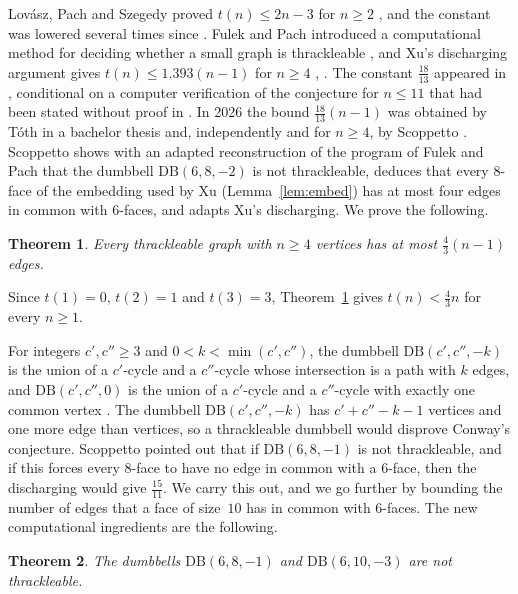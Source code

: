 \documentclass[11pt]{amsart}
\newtheorem{theorem}{Theorem}[section]
\theoremstyle{definition}
\theoremstyle{remark}
\numberwithin{equation}{section}
\newcommand{\DB}{\mathrm{DB}}
\newcommand{\cc}{\frac43}\newcommand{\ccs}{4/3}\newcommand{\ccdec}{1.3333\ldots}
\begin{document}
Lov\'asz, Pach and Szegedy proved $t(n)\le2n-3$ for $n\ge2$ \cite{LPS97}, and the constant was lowered several times since \cite{CN00,FP11,GX17,FP19,Xu21}. Fulek and Pach introduced a computational method for deciding whether a small graph is thrackleable \cite{FP11}, and Xu's discharging argument gives $t(n)\le1.393(n-1)$ for $n\ge4$ \cite{Xu21}, \cite[Section~3.1]{Sco26}. The constant $\frac{18}{13}$ appeared in \cite[Remark~2]{FP19}, conditional on a computer verification of the conjecture for $n\le11$ that had been stated without proof in \cite{CN09}. In 2026 the bound $\frac{18}{13}(n-1)$ was obtained by T\'oth in a bachelor thesis \cite{Tot26} and, independently and for $n\ge4$, by Scoppetto \cite[Theorem~1.1]{Sco26}. Scoppetto shows with an adapted reconstruction of the program of Fulek and Pach that the dumbbell $\DB(6,8,-2)$ is not thrackleable, deduces that every $8$-face of the embedding used by Xu (Lemma~\ref{lem:embed}) has at most four edges in common with $6$-faces, and adapts Xu's discharging. We prove the following.

\begin{theorem}\label{thm:main}
Every thrackleable graph with $n\ge4$ vertices has at most $\cc(n-1)$ edges.
\end{theorem}

Since $t(1)=0$, $t(2)=1$ and $t(3)=3$, Theorem~\ref{thm:main} gives $t(n)<\cc n$ for every $n\ge1$.

For integers $c',c''\ge3$ and $0<k<\min(c',c'')$, the dumbbell $\DB(c',c'',-k)$ is the union of a $c'$-cycle and a $c''$-cycle whose intersection is a path with $k$ edges, and $\DB(c',c'',0)$ is the union of a $c'$-cycle and a $c''$-cycle with exactly one common vertex \cite{FP11}. The dumbbell $\DB(c',c'',-k)$ has $c'+c''-k-1$ vertices and one more edge than vertices, so a thrackleable dumbbell would disprove Conway's conjecture. Scoppetto pointed out \cite[Section~7.2]{Sco26} that if $\DB(6,8,-1)$ is not thrackleable, and if this forces every $8$-face to have no edge in common with a $6$-face, then the discharging would give $\frac{15}{11}$. We carry this out, and we go further by bounding the number of edges that a face of size~$10$ has in common with $6$-faces. The new computational ingredients are the following.

\begin{theorem}\label{thm:db}
The dumbbells $\DB(6,8,-1)$ and $\DB(6,10,-3)$ are not thrackleable.
\end{theorem}
\end{document}
